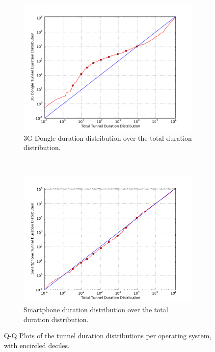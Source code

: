 \begin{figure}
        \begin{subfigure}[b]{0.50\textwidth}
                        \centering
                \includegraphics[width=\textwidth]{images/CONEXT2012/qq-total-vs-dongle.pdf}
                \caption{3G Dongle duration distribution over the total duration distribution.}
                \label{fig:qq-total-vs-dongle}
        \end{subfigure}%
        ~
        \begin{subfigure}[b]{0.50\textwidth}
                        \centering
                \includegraphics[width=\textwidth]{images/CONEXT2012/qq-total-vs-smartphone.pdf}
                \caption{Smartphone duration distribution over the total duration distribution.}
                \label{fig:qq-total-vs-smartphones}
        \end{subfigure}
 \caption{Q-Q Plots of the tunnel duration distributions per operating system, with encircled deciles.}
\label{fig:qq-plots}
\end{figure}


